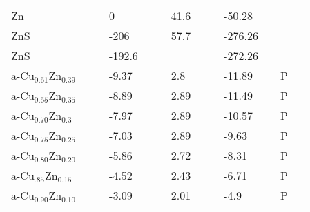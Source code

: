 \begin{landscape}
\begin{center}
\begin{longtable}{|l|p{2.5cm}|l|p{2.5cm}|l|l|p{2.5cm}|l|l|p{2.5cm}|l|l|l|}
Zn                          &            &                     & 0       &  & \citep{Haynes2013}                           & 41.6   &  & \citep{Haynes2013}                           & -50.28  &  & \citep{Barin1977}  \\
ZnS                         &            &                     & -206    &  & \citep{Haynes2013}                           & 57.7   &  & \citep{Haynes2013}                           & -276.26 &  & \citep{Haynes2013} \\
ZnS                         &            &                     & -192.6  &  & \citep{Haynes2013}                           &        &  &                                                & -272.26 &  & \citep{Haynes2013} \\
a-Cu$_{0.61}$Zn$_{0.39}$    &            &                     & -9.37   &  & \citep{KubaschewskiCatterallJohnAshley.1956} & 2.8    &  & \citep{KubaschewskiCatterallJohnAshley.1956} & -11.89  &  & P                    \\
a-Cu$_{0.65}$Zn$_{0.35}$    &            &                     & -8.89   &  & \citep{KubaschewskiCatterallJohnAshley.1956} & 2.89   &  & \citep{KubaschewskiCatterallJohnAshley.1956} & -11.49  &  & P                    \\
a-Cu$_{0.70}$Zn$_{0.3}$     &            &                     & -7.97   &  & \citep{KubaschewskiCatterallJohnAshley.1956} & 2.89   &  & \citep{KubaschewskiCatterallJohnAshley.1956} & -10.57  &  & P                    \\
a-Cu$_{0.75}$Zn$_{0.25}$    &            &                     & -7.03   &  & \citep{KubaschewskiCatterallJohnAshley.1956} & 2.89   &  & \citep{KubaschewskiCatterallJohnAshley.1956} & -9.63   &  & P                    \\
a-Cu$_{0.80}$Zn$_{0.20}$    &            &                     & -5.86   &  & \citep{KubaschewskiCatterallJohnAshley.1956} & 2.72   &  & \citep{KubaschewskiCatterallJohnAshley.1956} & -8.31   &  & P                    \\
a-Cu$_{.85}$Zn$_{0.15 }$    &            &                     & -4.52   &  & \citep{KubaschewskiCatterallJohnAshley.1956} & 2.43   &  & \citep{KubaschewskiCatterallJohnAshley.1956} & -6.71   &  & P                    \\
a-Cu$_{0.90}$Zn$_{0.10 }$   &            &                     & -3.09   &  & \citep{KubaschewskiCatterallJohnAshley.1956} & 2.01   &  & \citep{KubaschewskiCatterallJohnAshley.1956} & -4.9    &  & P                    \\

\end{longtable}
\end{center}
\end{landscape}
